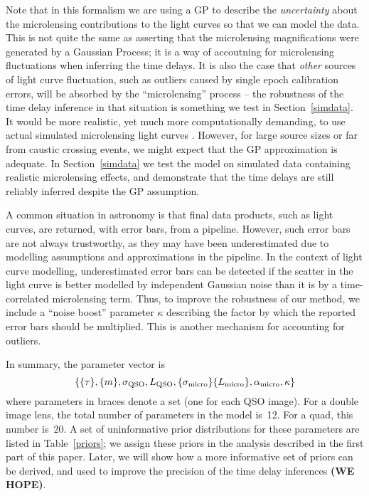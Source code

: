 \documentclass[useAMS,usenatbib, a4paper]{mn2e} \usepackage{natbib}
\begin{document}
Note that in this formalism we are using a  GP to describe the {\it
uncertainty} about the microlensing contributions to the light curves so that
we can model the data. This is not quite the same as asserting that the
microlensing magnifications were generated by a Gaussian Process; it is a way
of accoutning for microlensing fluctuations when inferring the time delays. It
is also the case that {\it other} sources of light curve fluctuation, such as
outliers caused by single epoch calibration errors, will be absorbed by the
``microlensing'' process -- the robustness of the time delay inference in that
situation is something we test in Section~\ref{simdata}. It would be more
realistic, yet much more computationally demanding, to use actual simulated
microlensing  light curves \citep{1999JCoAM.109..353W, 2008ApJ...676...80M,
2010NewA...15..181G}. However, for large source sizes or far from caustic
crossing events, we might expect that the GP approximation is adequate. In
Section~\ref{simdata} we test the model on simulated data containing realistic
microlensing effects, and demonstrate that the time delays are still reliably
inferred despite the GP assumption.

A common situation in astronomy is that final data products, such as light
curves, are returned, with error bars, from a pipeline. However, such error
bars are not always trustworthy, as they may have been underestimated due to
modelling assumptions and approximations in the pipeline. In the context of
light curve modelling, underestimated error bars can be detected if the
scatter in the light curve is better modelled by independent Gaussian noise
than it is by a time-correlated microlensing term. Thus, to improve the
robustness of our method, we include a ``noise boost'' parameter $\kappa$
describing the factor by which the reported error bars should be multiplied.
This is another mechanism for accounting for outliers.

In summary, the parameter vector is
\begin{equation}
\left\{ \{\tau\}, \{m\}, \sigma_{\rm QSO}, L_{\rm QSO}, \{\sigma_{\rm micro}\}
\{L_{\rm micro}\}, \alpha_{\rm micro}, \kappa \right\}
\end{equation}
where parameters in braces denote a set (one for each QSO image).  For a
double image lens, the total number of parameters in the model is~12. For a
quad, this number is~20. A set of uninformative prior
distributions for these parameters are listed in Table~\ref{priors}; we assign
these priors in the analysis described in the first part of this paper. Later,
we will show how a more informative set of priors can be derived, and used to
improve the precision of the time delay inferences {\bf (WE HOPE)}.
\end{document}

